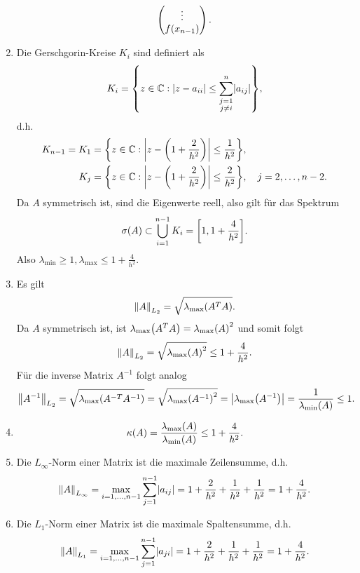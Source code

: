 \documentclass{exercise}
\begin{document}
\begin{enumerate}
\[\begin{pmatrix}
                \vdots\\
                f\parentheses*{x_{n - 1}}
            \end{pmatrix}.
        \]
        \item Die Gerschgorin-Kreise \(K_i\) sind definiert als
        \[
            K_i = \braces*{z \in \C : \absolute*{z - a_{ii}} \le \sum_{\substack{j = 1\\j \ne i}}^n \absolute*{a_{ij}}},
        \]
        d.h.
        \begin{align*}
            K_{n - 1} = K_1 &= \braces*{z \in \C : \absolute*{z - \parentheses*{1 + \frac{2}{h^2}}} \le \frac{1}{h^2}},\\
            K_j &= \braces*{z \in \C : \absolute*{z - \parentheses*{1 + \frac{2}{h^2}}} \le \frac{2}{h^2}}, \quad j = 2, \ldots, n - 2.
        \end{align*}
        Da \(A\) symmetrisch ist, sind die Eigenwerte reell, also gilt für das Spektrum
        \[
            \sigma\parentheses*{A} \subset \bigcup_{i = 1}^{n - 1}K_i = \brackets*{1, 1 + \frac{4}{h^2}}.
        \]
        Also \(\lambda_{\text{min}} \ge 1, \lambda_{\text{max}} \le 1 + \frac{4}{h^2}\).
        \item Es gilt
        \[
            \norm*{A}_{L_2} = \sqrt{\lambda_{\text{max}}\parentheses*{A^T A}}.
        \]
        Da \(A\) symmetrisch ist, ist \(\lambda_{\text{max}}\parentheses*{A^T A} = \lambda_{\text{max}}\parentheses*{A}^2\) und somit folgt
        \[
            \norm*{A}_{L_2} = \sqrt{\lambda_{\text{max}}\parentheses*{A}^2} \le 1 + \frac{4}{h^2}.
        \]
        Für die inverse Matrix \(A^{-1}\) folgt analog
        \[
            \norm*{A^{-1}}_{L_2} = \sqrt{\lambda_{\text{max}}\parentheses*{A^{-T}A^{-1}}} = \sqrt{\lambda_{\text{max}}\parentheses*{A^{-1}}^2} = \absolute*{\lambda_{\text{max}}\parentheses*{A^{-1}}} = \frac{1}{\lambda_{\text{min}}\parentheses*{A}} \le 1.
        \]
        \item
        \[
            \kappa\parentheses*{A} = \frac{\lambda_{\text{max}}\parentheses*{A}}{\lambda_{\text{min}}\parentheses*{A}} \le 1 + \frac{4}{h^2}.
        \]
        \item Die \(L_\infty\)-Norm einer Matrix ist die maximale Zeilensumme, d.h.
        \[
            \norm*{A}_{L_\infty} = \max_{i = 1, \ldots, n - 1}\sum_{j = 1}^{n - 1}\absolute*{a_{ij}} = 1 + \frac{2}{h^2} + \frac{1}{h^2} + \frac{1}{h^2} = 1 + \frac{4}{h^2}.
        \]
        \item Die \(L_1\)-Norm einer Matrix ist die maximale Spaltensumme, d.h.
        \[
            \norm*{A}_{L_1} = \max_{i = 1, \ldots, n - 1}\sum_{j = 1}^{n - 1}\absolute*{a_{ji}} = 1 + \frac{2}{h^2} + \frac{1}{h^2} + \frac{1}{h^2} = 1 + \frac{4}{h^2}.
        \]
    \end{enumerate}
\end{document}
